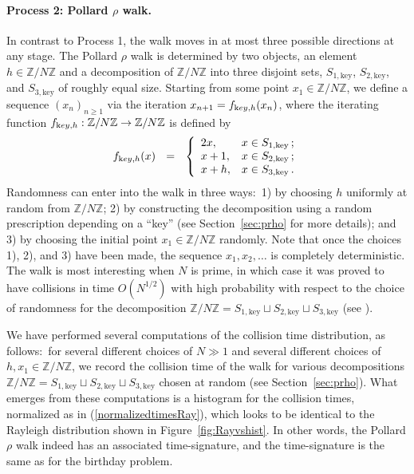 \documentclass{llncs}
\numberwithin{equation}{section}
\newcommand{\Z}{{\mathbb{Z}}}
\renewcommand\({\left(}
\renewcommand\){\right)}
\begin{document}
\paragraph{\bf Process 2: Pollard $\rho$ walk.}
In contrast to Process 1, the walk moves in at most three possible directions at any stage.
The Pollard $\rho$ walk is determined by two objects, an element $h\in \Z/N\Z$ and a decomposition
of $\Z/N\Z$ into three disjoint sets, $S_{1,\text{key}}$, $S_{2,\text{key}}$, and $S_{3,\text{key}}$ of roughly equal size.
  Starting from some point $x_1\in \Z/N\Z$, we define a sequence $(x_n)_{n\ge 1}$ via the iteration  $x_{n+1}=f_{{\text key},h}(x_n)$, where the iterating function  $f_{{\text key},h}:\Z/N\Z\rightarrow \Z/N\Z$ is defined by
  \begin{equation}\label{fkey}
 f_{{\text key},h}(x) \ \ = \ \ \left\{
                                 \begin{array}{ll}
                                   2x, & x\in S_{1,\text{key}}\,; \\
                                   x+1, & x\in S_{2,\text{key}}\,; \\
                                   x+h, & x\in S_{3,\text{key}}\,.
                                 \end{array}
                               \right.
  \end{equation}
  Randomness can enter into the walk in three ways:~1) by choosing $h$ uniformly at random from $\Z/N\Z$; 2) by constructing the decomposition using a random prescription depending on a ``key'' (see Section~\ref{sec:prho} for more details); and 3) by choosing the initial point $x_1\in \Z/N\Z$ randomly.  Note that once the choices 1), 2), and 3) have been made, the sequence $x_1,x_2,\ldots$ is completely deterministic.
   The walk is most interesting when $N$ is prime, in which case it was proved to have collisions in time $O(N^{1/2})$ with high probability with respect to the choice of randomness for the decomposition $\Z/N\Z=S_{1,\text{key}}\sqcup S_{2,\text{key}}\sqcup S_{3,\text{key}}$   (see \cite{KMPT,Mo,MV1,MV2}).

     We have performed several computations of the collision time distribution, as follows:~for  several different choices of $N\gg 1$  and several different choices of  $h,x_1\in \Z/N\Z$, we record the collision time of the walk for various
     decompositions $\Z/N\Z=S_{1,\text{key}}\sqcup S_{2,\text{key}}\sqcup S_{3,\text{key}}$ chosen at random (see Section~\ref{sec:prho}).  What emerges from these computations is a  histogram for the collision times, normalized as in (\ref{normalizedtimesRay}), which looks to be identical to the Rayleigh distribution shown in Figure~\ref{fig:Rayvshist}.     In other words, the Pollard $\rho$ walk indeed has an associated time-signature, and the time-signature is the same as for the birthday problem.
   \\
\end{document}
